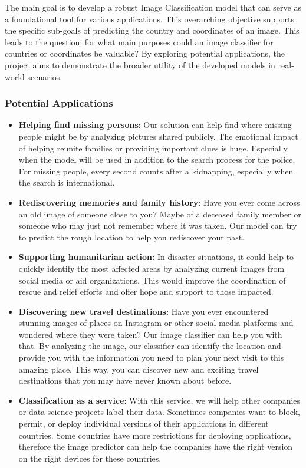 The main goal is to develop a robust Image Classification model that can
serve as a foundational tool for various applications. This overarching
objective supports the specific sub-goals of predicting the country and
coordinates of an image. This leads to the question: for what main
purposes could an image classifier for countries or coordinates be
valuable? By exploring potential applications, the project aims to
demonstrate the broader utility of the developed models in real-world
scenarios.

\subsubsection{Potential Applications}\label{potential-applications}

\begin{itemize}
\tightlist
\item
  \textbf{Helping find missing persons}: Our solution can help find
  where missing people might be by analyzing pictures shared publicly.
  The emotional impact of helping reunite families or providing
  important clues is huge. Especially when the model will be used in
  addition to the search process for the police. For missing people,
  every second counts after a kidnapping, especially when the search is
  international.
\item
  \textbf{Rediscovering memories and family history}: Have you ever come
  across an old image of someone close to you? Maybe of a deceased
  family member or someone who may just not remember where it was taken.
  Our model can try to predict the rough location to help you rediscover
  your past.
\item
  \textbf{Supporting humanitarian action:} In disaster situations, it
  could help to quickly identify the most affected areas by analyzing
  current images from social media or aid organizations. This would
  improve the coordination of rescue and relief efforts and offer hope
  and support to those impacted.
\item
  \textbf{Discovering new travel destinations:} Have you ever
  encountered stunning images of places on Instagram or other social
  media platforms and wondered where they were taken? Our image
  classifier can help you with that. By analyzing the image, our
  classifier can identify the location and provide you with the
  information you need to plan your next visit to this amazing place.
  This way, you can discover new and exciting travel destinations that
  you may have never known about before.
\item
  \textbf{Classification as a service}: With this service, we will help
  other companies or data science projects label their data. Sometimes
  companies want to block, permit, or deploy individual versions of
  their applications in different countries. Some countries have more
  restrictions for deploying applications, therefore the image predictor
  can help the companies have the right version on the right devices for
  these countries.
\end{itemize}

